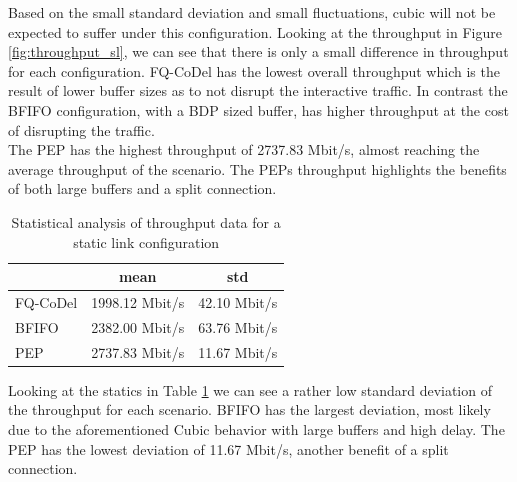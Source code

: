 \documentclass[a4paper,english, 11pt]{report}
\begin{document}
Based on the small standard deviation and small fluctuations, cubic will not be expected to suffer under this configuration. Looking at the throughput in Figure \ref{fig:throughput_sl}, we can see that there is only a small difference in throughput for each configuration. FQ-CoDel has the lowest overall throughput which is the result of lower buffer sizes as to not disrupt the interactive traffic. In contrast the BFIFO configuration, with a BDP sized buffer, has higher throughput at the cost of disrupting the traffic.\\

The PEP has the highest throughput of 2737.83 Mbit/s, almost reaching the average throughput of the scenario. The PEPs throughput highlights the benefits of both large buffers and a split connection.\\

\begin{table}[h!]
\centering
\begin{tabular}{l|c|c}
\hline
 & \textbf{mean} & \textbf{std} \\
\hline
FQ-CoDel & 1998.12 Mbit/s & 42.10 Mbit/s  \\
BFIFO    & 2382.00 Mbit/s & 63.76 Mbit/s  \\
PEP      & 2737.83 Mbit/s & 11.67 Mbit/s  \\
\hline
\end{tabular}
\caption{Statistical analysis of throughput data for a static link configuration}
\label{tab:throughput_sl_table}
\end{table}

Looking at the statics in Table \ref{tab:throughput_sl_table} we can see a rather low standard deviation of the throughput for each scenario. BFIFO has the largest deviation, most likely due to the aforementioned Cubic behavior with large buffers and high delay. The PEP has the lowest deviation of 11.67 Mbit/s, another benefit of a split connection.\\
\end{document}
